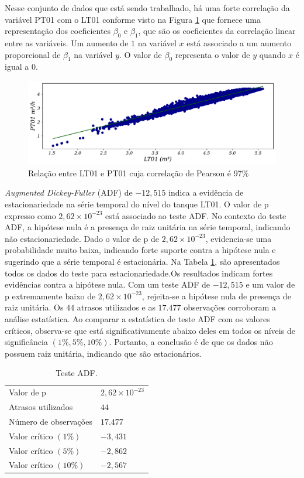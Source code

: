 Nesse conjunto de dados que está sendo trabalhado, há uma forte correlação da variável PT01 com o LT01 conforme visto na Figura \ref{fig:lr-lt01-m3} que fornece uma representação dos coeficientes $\beta_0$ e $\beta_1$, que são os coeficientes da correlação linear entre as variáveis. Um aumento de $1$ na variável $x$ está associado a um aumento proporcional de $\beta_1$ na variável $y$. O valor de $\beta_0$ representa o valor de $y$ quando $x$ é igual a $0$.

\begin{figure}[!htb]
	\centering
	\caption{Relação entre LT01 e PT01 cuja correlação de Pearson é 97\%}
	\label{fig:lr-lt01-m3}
	\includegraphics[width=0.7\linewidth]{Resultados/Figuras/LR}
\end{figure}

\textit{Augmented Dickey-Fuller} (ADF) de $-12,515$ indica a evidência de estacionariedade na série temporal do nível do tanque LT01. 
O valor de p expresso como $2,62\times 10^{-23}$ está associado ao teste ADF. No contexto do teste ADF, a hipótese nula é a presença de raiz unitária na série temporal, indicando não estacionariedade. Dado o valor de p de $2,62\times 10^{-23}$, evidencia-se uma probabilidade muito baixa, indicando forte suporte contra a hipótese nula e sugerindo que a série temporal é estacionária. Na Tabela \ref{tb:adf}, são apresentados todos os dados do teste para estacionariedade.Os resultados indicam fortes evidências contra a hipótese nula. Com um teste ADF de $-12,515 $ e um valor de p extremamente baixo de $2,62 \times 10^{-23}$, rejeita-se a hipótese nula de presença de raiz unitária. Os $44$ atrasos utilizados e as $17.477$ observações corroboram a análise estatística. Ao comparar a estatística de teste ADF com os valores críticos, observa-se que está significativamente abaixo deles em todos os níveis de significância $(1\%, 5\%, 10\%)$. Portanto, a conclusão é de que os dados não possuem raiz unitária, indicando que são estacionários.

\begin{table}[!htb]
	\centering
	\caption{Teste ADF.}\label{tb:adf}
	\begin{tabular}{ll}
		\hline
		Valor de p & $2,62 \times 10^{-23}$ \\
		Atrasos utilizados & $44$ \\
		Número de observações & $17.477$ \\
		Valor crítico $(1\%)$ & $-3,431$ \\
		Valor crítico $(5\%)$ & $-2,862$ \\
		Valor crítico $(10\%)$ & $-2,567$ \\
		\hline
	\end{tabular}
\end{table}


